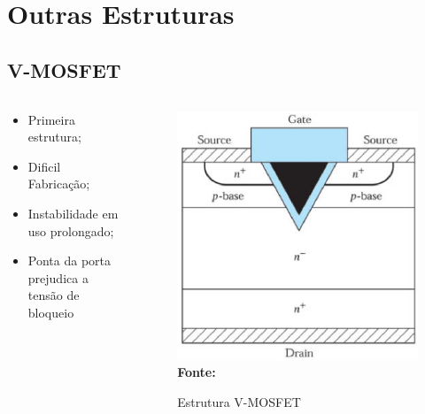 \section{Outras Estruturas}

\subsection{V-MOSFET}

\begin{frame}

    \begin{columns}[t]
    
        \begin{column}{7cm}

            \begin{itemize}
                \item Primeira estrutura;
                \item Dificil Fabricação;
                \item Instabilidade em uso prolongado;
                \item Ponta da porta prejudica a tensão de bloqueio
            \end{itemize}

        \end{column}

        \begin{column}{7cm}

            \begin{figure}[!htbp]
                \centering
                \caption{Estrutura V-MOSFET}
                \includegraphics[scale=0.2]{imagens/vmosfet.png}
                \\\small{\textbf{Fonte:} \cite{sze2012semiconductor}}%
            \end{figure}


\end{column}
\end{columns}
\end{frame}
